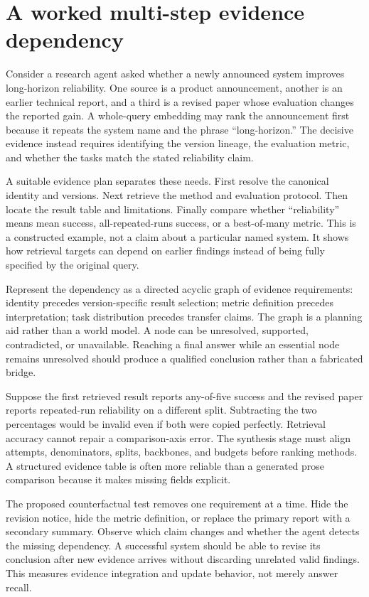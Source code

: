 \section{A worked multi-step evidence dependency}\label{sec:C16:worked}
Consider a research agent asked whether a newly announced system improves long-horizon reliability. One source is a product announcement, another is an earlier technical report, and a third is a revised paper whose evaluation changes the reported gain. A whole-query embedding may rank the announcement first because it repeats the system name and the phrase ``long-horizon.'' The decisive evidence instead requires identifying the version lineage, the evaluation metric, and whether the tasks match the stated reliability claim.

A suitable evidence plan separates these needs. First resolve the canonical identity and versions. Next retrieve the method and evaluation protocol. Then locate the result table and limitations. Finally compare whether ``reliability'' means mean success, all-repeated-runs success, or a best-of-many metric. This is a constructed example, not a claim about a particular named system. It shows how retrieval targets can depend on earlier findings instead of being fully specified by the original query.

Represent the dependency as a directed acyclic graph of evidence requirements: identity precedes version-specific result selection; metric definition precedes interpretation; task distribution precedes transfer claims. The graph is a planning aid rather than a world model. A node can be unresolved, supported, contradicted, or unavailable. Reaching a final answer while an essential node remains unresolved should produce a qualified conclusion rather than a fabricated bridge.

Suppose the first retrieved result reports any-of-five success and the revised paper reports repeated-run reliability on a different split. Subtracting the two percentages would be invalid even if both were copied perfectly. Retrieval accuracy cannot repair a comparison-axis error. The synthesis stage must align attempts, denominators, splits, backbones, and budgets before ranking methods. A structured evidence table is often more reliable than a generated prose comparison because it makes missing fields explicit.

The proposed counterfactual test removes one requirement at a time. Hide the revision notice, hide the metric definition, or replace the primary report with a secondary summary. Observe which claim changes and whether the agent detects the missing dependency. A successful system should be able to revise its conclusion after new evidence arrives without discarding unrelated valid findings. This measures evidence integration and update behavior, not merely answer recall.


